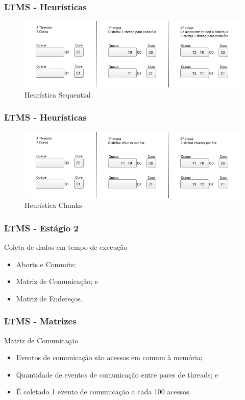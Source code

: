 \documentclass[10pt, pdf,xcolor=pdftex,dvipsnames,table]{beamer}
\begin{document}
\begin{frame} \frametitle{LTMS - Heurísticas}
    \begin{figure}[!h]
        \includegraphics[scale=0.4]{images/Queue_one}
        \caption{Heurística Sequential}
        \label{fig:abusy}
    \end{figure}
\end{frame}

\begin{frame} \frametitle{LTMS - Heurísticas}
    \begin{figure}[!h]
        \includegraphics[scale=0.4]{images/Queue_chunks}
        \caption{Heurística Chunks}
        \label{fig:abusy}
    \end{figure}
\end{frame}

\begin{frame} \frametitle{LTMS - Estágio 2}
    \begin{block}{Coleta de dados em tempo de execução}
        \begin{itemize}
        	\item Aborts e Commits;
        	\item Matriz de Comunicação; e 
        	\item Matriz de Endereços.
        \end{itemize}
    \end{block}
\end{frame}

\begin{frame} \frametitle{LTMS - Matrizes}
    \begin{block}{Matriz de Comunicação}
        \begin{itemize}
        	\item Eventos de comunicação são acessos em comum à memória;
        	\item Quantidade de eventos de comunicação entre pares de threads; e
        	\item É coletado 1 evento de comunicação a cada 100 acessos.
        \end{itemize}
    \end{block}
\end{frame}
\end{document}
